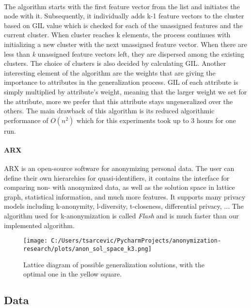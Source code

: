 \documentclass{article}
\begin{document}
\paragraph{}
The algorithm starts with the first feature vector from the list and initiates the node with it. Subsequently, it individually adds k-1 feature vectors to the cluster based on GIL value which is checked for each of the unassigned features and the current cluster. When cluster reaches k elements, the process continues with initializing a new cluster with the next unassigned feature vector. When there are less than \textit{k} unassigned feature vectors left, they are dispersed among the existing clusters. The choice of clusters is also decided by calculating GIL. 
Another interesting element of the algorithm are the weights that are giving the importance to attributes in the generalization process. GIL of each attribute is simply multiplied by attribute's weight, meaning that the larger weight we set for the attribute, more we prefer that this attribute stays ungeneralized over the others.
The main drawback of this algorithm is its reduced algorithmic performance of ${O(n^2)}$ which for this experiments took up to 3 hours for one run.

\paragraph{ARX}
ARX \cite{prasser2015putting} is an open-source software for anonymizing personal data. The user can define their own hierarchies for quasi-identifiers, it contains the interface for comparing non- with anonymized data, as well as the solution space in lattice graph, statistical information, and much more features. It supports many privacy models including k-anonymity, l-diversity, t-closeness, differential privacy, ... The algorithm used for k-anonymization is called \textit{Flash} \cite{kohlmayer2012flash} and is much faster than our implemented algorithm.

\begin{figure}
	\texttt{[image: C:/Users/tsarcevic/PycharmProjects/anonymization-research/plots/anon\_sol\_space\_k3.png]}
	\caption{Lattice diagram of possible generalization solutions, with the optimal one in the yellow square.}
 	\label{fig:lattice}
\end{figure}

\subsection{Data}
\end{document}
